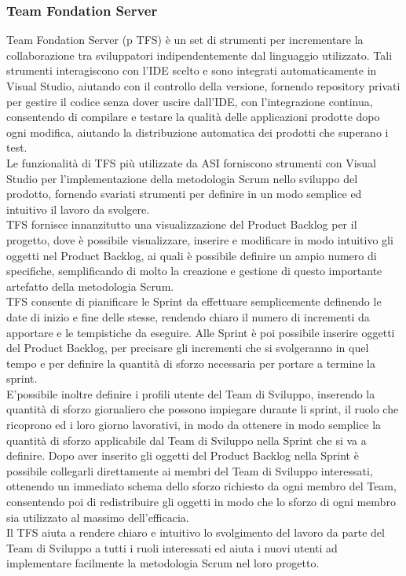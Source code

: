 \subsubsection{Team Fondation Server}
Team Fondation Server (p TFS) è un set di strumenti per incrementare la collaborazione tra sviluppatori indipendentemente dal linguaggio utilizzato. Tali strumenti interagiscono con l'IDE scelto e sono integrati automaticamente in Visual Studio, aiutando con il controllo della versione, fornendo repository privati per gestire il codice senza dover uscire dall'IDE, con l'integrazione continua, consentendo di compilare e testare la qualità delle applicazioni prodotte dopo ogni modifica, aiutando la distribuzione automatica dei prodotti che superano i test.
\\
Le funzionalità di TFS più utilizzate da ASI forniscono strumenti con Visual Studio per l'implementazione della metodologia Scrum nello sviluppo del prodotto, fornendo svariati strumenti per definire in un modo semplice ed intuitivo il lavoro da svolgere.
\\
TFS fornisce innanzitutto una visualizzazione del Product Backlog per il progetto, dove è possibile visualizzare, inserire e modificare in modo intuitivo gli oggetti nel Product Backlog, ai quali è possibile definire un ampio numero di specifiche, semplificando di molto la creazione e gestione di questo importante artefatto della metodologia Scrum.
\\
TFS consente di pianificare le Sprint da effettuare semplicemente definendo le date di inizio e fine delle stesse, rendendo chiaro il numero di incrementi da apportare e le tempistiche da eseguire. Alle Sprint è poi possibile inserire oggetti del Product Backlog, per precisare gli incrementi che si svolgeranno in quel tempo e per definire la quantità di sforzo necessaria per portare a termine la sprint.
\\
E'possibile inoltre definire i profili utente del Team di Sviluppo, inserendo la quantità di sforzo giornaliero che possono impiegare durante li sprint, il ruolo che ricoprono ed i loro giorno lavorativi, in modo da ottenere in modo semplice la quantità di sforzo applicabile dal Team di Sviluppo nella Sprint che si va a definire. Dopo aver inserito gli oggetti del Product Backlog nella Sprint è possibile collegarli direttamente ai membri del Team di Sviluppo interessati, ottenendo un immediato schema dello sforzo richiesto da ogni membro del Team, consentendo poi di redistribuire gli oggetti in modo che lo sforzo di ogni membro sia utilizzato al massimo dell'efficacia.
\\
Il TFS aiuta a rendere chiaro e intuitivo lo svolgimento del lavoro da parte del Team di Sviluppo a tutti i ruoli interessati ed aiuta i nuovi utenti ad implementare facilmente la metodologia Scrum nel loro progetto.

